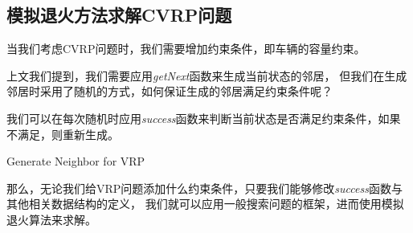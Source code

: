 \subsection{模拟退火方法求解CVRP问题}

当我们考虑CVRP问题时，我们需要增加约束条件，即车辆的容量约束。

上文我们提到，我们需要应用\textit{getNext}函数来生成当前状态的邻居，
但我们在生成邻居时采用了随机的方式，如何保证生成的邻居满足约束条件呢？

我们可以在每次随机时应用\textit{success}函数来判断当前状态是否满足约束条件，如果不满足，则重新生成。

\begin{algorithm}[H]




    \caption{Generate Neighbor for VRP}
\end{algorithm}

那么，无论我们给VRP问题添加什么约束条件，只要我们能够修改\textit{success}函数与其他相关数据结构的定义，
我们就可以应用一般搜索问题的框架，进而使用模拟退火算法来求解。